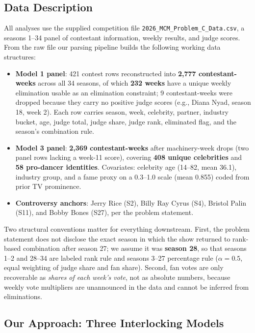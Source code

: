 \documentclass[11pt]{article}
\begin{document}
\subsection{Data Description}

All analyses use the supplied competition file
\texttt{2026\_MCM\_Problem\_C\_Data.csv}, a seasons 1--34 panel of
contestant information, weekly results, and judge scores. From the raw file
our parsing pipeline builds the following working data structures:

\begin{itemize}
\item \textbf{Model 1 panel}: 421 contest rows reconstructed into
      \textbf{2{,}777 contestant-weeks} across all 34 seasons, of which
      \textbf{232 weeks} have a unique weekly elimination usable as an
      elimination constraint; 9 contestant-weeks were dropped because they
      carry no positive judge scores (e.g., Diana Nyad, season 18, week 2).
      Each row carries season, week, celebrity, partner, industry bucket,
      age, judge total, judge share, judge rank, eliminated flag, and the
      season's combination rule.
\item \textbf{Model 3 panel}: \textbf{2{,}369 contestant-weeks} after
      machinery-week drops (two panel rows lacking a week-11 score),
      covering \textbf{408 unique celebrities} and \textbf{58 pro-dancer
      identities}. Covariates: celebrity age (14--82, mean 36.1),
      industry group, and a fame proxy on a 0.3--1.0 scale
      (mean 0.855) coded from prior TV prominence.
\item \textbf{Controversy anchors}: Jerry Rice (S2), Billy Ray Cyrus (S4),
      Bristol Palin (S11), and Bobby Bones (S27), per the problem statement.
\end{itemize}

Two structural conventions matter for everything downstream. First, the
problem statement does not disclose the exact season in which the show
returned to rank-based combination after season 27; we assume it was
\textbf{season 28}, so that seasons 1--2 and 28--34 are labeled rank rule
and seasons 3--27 percentage rule ($\alpha = 0.5$, equal weighting of judge
share and fan share). Second, fan votes are only recoverable as
\emph{shares of each week's vote}, not as absolute numbers, because weekly
vote multipliers are unannounced in the data and cannot be inferred from
eliminations.

\subsection{Our Approach: Three Interlocking Models}
\end{document}

